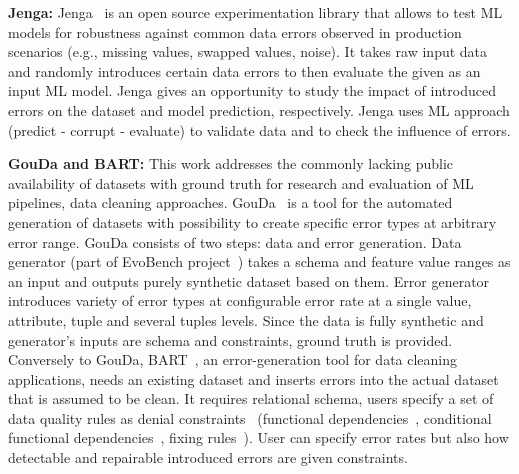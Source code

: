 
\textbf{Jenga:} 
Jenga~\cite{jenga} is an open source experimentation library that allows to test ML models for robustness against common data errors observed in production scenarios (e.g., missing values, swapped values, noise).
It takes raw input data and randomly introduces certain data errors to then evaluate the given as an input ML model.
Jenga gives an opportunity to study the impact of introduced errors on the dataset and model prediction, respectively.
Jenga uses ML approach (predict - corrupt - evaluate) to validate data and to check the influence of errors.

\textbf{GouDa and BART:} 
This work addresses the commonly lacking public availability of datasets with ground truth for research and evaluation of ML pipelines, data cleaning approaches. 
GouDa~\cite{RestatGCS2022} is a tool for the automated generation of datasets with possibility to create specific error types at arbitrary error range.
GouDa consists of two steps: data and error generation.
Data generator (part of EvoBench project~\cite{evobench}) takes a schema and feature value ranges as an input and outputs purely synthetic dataset based on them. 
Error generator introduces variety of error types at configurable error rate at a single value, attribute, tuple and several tuples levels.
Since the data is fully synthetic and generator's inputs are schema and constraints, ground truth is provided. 
Conversely to GouDa, BART~\cite{bart}, an error-generation tool for data cleaning applications, needs an existing dataset and inserts errors into the actual dataset that is assumed to be clean. It requires relational schema, users specify
a set of data quality rules as denial constraints~\cite{denialconst} (functional dependencies~\cite{BohannonFGJK2007,  QahtanTOCS2020}, conditional functional dependencies~\cite{FanGJK2008}, fixing rules~\cite{fixingrules}). 
User can specify error rates but also how detectable and repairable introduced errors are given constraints.

